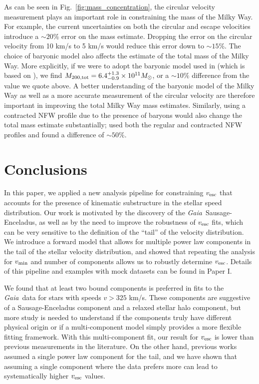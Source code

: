 \documentclass[twocolumn,preprintnumbers]{aastex63}
\DeclareRobustCommand{\Fig}[1]{Fig.~\ref{#1}}
\newcommand{\Gaia}{\textit{Gaia}~}
\newcommand{\vesc}{v_{\rm esc}}
\newcommand{\vmin}{v_{\rm min}}
\begin{document}
As can be seen in \Fig{fig:mass_concentration}, the circular velocity measurement plays an important role in constraining the mass of the Milky Way. For example, the current uncertainties on both the circular and escape velocities introduce a $\sim 20\%$ error on the mass estimate. Dropping the error on the circular velocity from 10 km/s to 5 km/s would reduce this error down to $\sim 15\%$. The choice of baryonic model also affects the estimate of the total mass of the Milky Way. More explicitly, if we were to adopt the baryonic model used in \cite{2014A&A...562A..91P} (which is based on \cite{2008ApJ...684.1143X}), we find $M_{200, \rm{tot}} = 6.4^{+1.3}_{-0.9} \times 10^{11}M_{\odot}$, or a $\sim 10\%$ difference from the value we quote above. A better understanding of the baryonic model of the Milky Way as well as a more accurate measurement of the circular velocity are therefore important in improving the total Milky Way mass estimates. Similarly, using a contracted NFW profile due to the presence of baryons \citep{Schaller15} would also change the total mass estimate substantially; \cite{2014A&A...562A..91P} used both the regular and contracted NFW profiles and found a difference of $\sim 50\%$.

\section{Conclusions}
\label{sec:conclusions}

In this paper, we applied a new analysis pipeline for constraining $\vesc$ that accounts for the presence of kinematic substructure in the stellar speed distribution. Our work is motivated by the discovery of the \Gaia Sausage-Enceladus, as well as by the need to improve the robustness of $\vesc$ fits, which can be very sensitive to the definition of the ``tail'' of the velocity distribution. We introduce a forward model that allows for multiple power law components in the tail of the stellar velocity distribution, and showed that repeating the analysis for $\vmin$ and number of components allows us to robustly determine $\vesc$. Details of this pipeline and examples with mock datasets can be found in Paper I.

We found that at least two bound components is preferred in fits to the \Gaia data for stars with speeds $v > 325$ km/s. These components are suggestive of a Sausage-Enceladus component and a relaxed stellar halo component, but more study is needed to understand if the components truly have different physical origin or if a multi-component model simply provides a more flexible fitting framework. With this multi-component fit, our result for $\vesc$ is lower than previous measurements in the literature. On the other hand, previous works assumed a single power law component for the tail, and we have shown that assuming a single component where the data prefers more can lead to systematically higher $\vesc$ values. 
\end{document}
